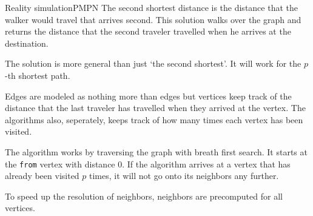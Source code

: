 \documentclass{writeup}
\begin{document}

\begin{solutions}
  \begin{solution}{Reality simulation}{PM}{PN}
    The second shortest distance is the distance that the walker would travel that arrives second.
    This solution walks over the graph and returns the distance that the second traveler travelled when he arrives at the destination.

    The solution is more general than just `the second shortest'.
    It will work for the $p$-th shortest path.


    Edges are modeled as nothing more than edges but vertices keep track of the distance that the last traveler has travelled when they arrived at the vertex.
    The algorithms also, seperately, keeps track of how many times each vertex has been visited.


    The algorithm works by traversing the graph with breath first search.
    It starts at the \texttt{from} vertex with distance $0$.
    If the algorithm arrives at a vertex that has already been visited $p$ times, it will not go onto its neighbors any further.


    To speed up the resolution of neighbors, neighbors are precomputed for all vertices.


  \end{solution}
\end{solutions}
\end{document}
